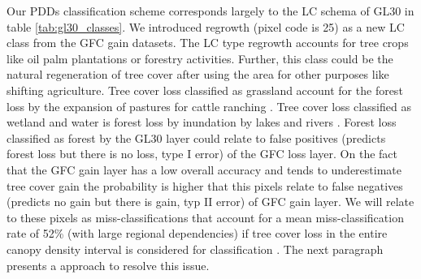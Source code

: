 			Our \acp{PDD} classification scheme corresponds largely to the \ac{LC} schema of \ac{GL30} in table \ref{tab:gl30_classes}. We introduced regrowth (pixel code is 25) as a new \ac{LC} class from the \ac{GFC} gain datasets. The \ac{LC} type regrowth accounts for tree crops like oil palm plantations or forestry activities. Further, this class could be the natural regeneration of tree cover after using the area for other purposes like shifting agriculture. Tree cover loss classified as grassland account for the forest loss by the expansion of pastures for cattle ranching \citep{Graesser2015}. Tree cover loss classified as wetland and water is forest loss by inundation by lakes and rivers \citep{Sy2015}. Forest loss classified as forest by the \ac{GL30} layer could relate to false positives (predicts forest loss but there is no loss, type I error) of the \ac{GFC} loss layer. On the fact that the \ac{GFC} gain layer has a low overall accuracy and tends to underestimate tree cover gain the probability is higher that this pixels relate to false negatives (predicts no gain but there is gain, typ II error) of \ac{GFC} gain layer. We will relate to these pixels as miss-classifications that account for a mean miss-classification rate of 52\% (with large regional dependencies) if tree cover loss in the entire canopy density interval is considered for classification \citep{Seydewitz2017}. The next paragraph presents a approach to resolve this issue. 

